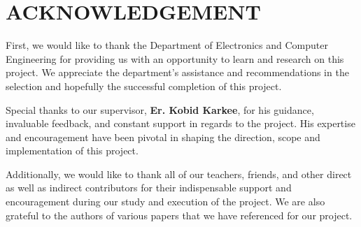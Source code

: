 \chapter*{ACKNOWLEDGEMENT}
{}

First, we would like to thank the Department of Electronics and Computer Engineering
for providing us with an opportunity to learn and research on this project. We appreciate
the department’s assistance and recommendations in the selection and hopefully the
successful completion of this project.

Special thanks to our supervisor, \textbf{Er. Kobid Karkee}, for his guidance, invaluable
feedback, and constant support in regards to the project. His expertise and
encouragement have been pivotal in shaping the direction, scope and implementation
of this project. 

Additionally, we would like to thank all of our teachers, friends, and other direct as well as indirect contributors for their indispensable support and encouragement during
our study and execution of the project. We are also grateful to the authors of various
papers that we have referenced for our project.

\vspace{1em}
\noindent \authorTable